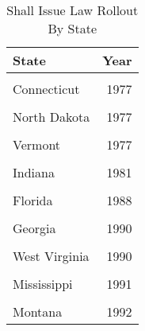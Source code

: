 \begin{table}[H]

\caption{\label{tab:tab:rollout}Shall Issue Law Rollout By State}
\centering
\begin{tabular}[t]{lr}
\toprule
State & Year\\
\midrule
\cellcolor{gray!6}{Alabama} & \cellcolor{gray!6}{1977}\\
Connecticut & 1977\\
\cellcolor{gray!6}{New Hampshire} & \cellcolor{gray!6}{1977}\\
North Dakota & 1977\\
\cellcolor{gray!6}{South Dakota} & \cellcolor{gray!6}{1977}\\
\addlinespace
Vermont & 1977\\
\cellcolor{gray!6}{Washington} & \cellcolor{gray!6}{1977}\\
Indiana & 1981\\
\cellcolor{gray!6}{Maine} & \cellcolor{gray!6}{1986}\\
Florida & 1988\\
\addlinespace
\cellcolor{gray!6}{Virginia} & \cellcolor{gray!6}{1989}\\
Georgia & 1990\\
\cellcolor{gray!6}{Pennsylvania} & \cellcolor{gray!6}{1990}\\
West Virginia & 1990\\
\cellcolor{gray!6}{Idaho} & \cellcolor{gray!6}{1991}\\
\addlinespace
Mississippi & 1991\\
\cellcolor{gray!6}{Oregon} & \cellcolor{gray!6}{1991}\\
Montana & 1992\\
\bottomrule
\end{tabular}
\end{table}
